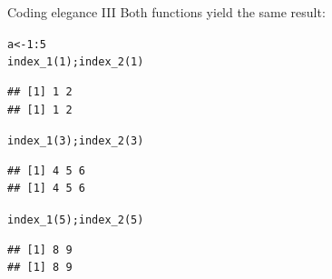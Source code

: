 \documentclass[xcolor=table,       handout,    xcolor=dvipsnames]{beamer}\usepackage[]{graphicx}\usepackage[]{color}
\makeatletter
\newcommand{\hlnum}[1]{\textcolor[rgb]{0,0,0}{#1}}
\newcommand{\hlopt}[1]{\textcolor[rgb]{0,0,0}{#1}}
\newcommand{\hlstd}[1]{\textcolor[rgb]{0,0,0}{#1}}
\newcommand{\hlkwb}[1]{\textcolor[rgb]{0,0,0}{#1}}
\newcommand{\hlkwd}[1]{\textcolor[rgb]{0,0,1}{#1}}
\newenvironment{kframe}{%
 \def\at@end@of@kframe{}%
 \ifinner\ifhmode%
  \def\at@end@of@kframe{\end{minipage}}%
  \begin{minipage}{\columnwidth}%
 \fi\fi%
 \def\FrameCommand##1{\hskip\@totalleftmargin \hskip-\fboxsep
 \colorbox{shadecolor}{##1}\hskip-\fboxsep
     \hskip-\linewidth \hskip-\@totalleftmargin \hskip\columnwidth}%
 \MakeFramed {\advance\hsize-\width
   \@totalleftmargin\z@ \linewidth\hsize
   \@setminipage}}%
 {\par\unskip\endMakeFramed%
 \at@end@of@kframe}
\newenvironment{knitrout}{}{} %
\makeatother
\begin{document}
\begin{frame}[fragile]{Coding elegance III}
Both functions yield the same result:
\begin{knitrout}\small
{}\color{fgcolor}\begin{kframe}
\begin{alltt}
\hlstd{a} \hlkwb{<-} \hlnum{1}\hlopt{:}\hlnum{5}
\hlkwd{index_1}\hlstd{(}\hlnum{1}\hlstd{);} \hlkwd{index_2}\hlstd{(}\hlnum{1}\hlstd{)}
\end{alltt}
\begin{verbatim}
## [1] 1 2
## [1] 1 2
\end{verbatim}
\begin{alltt}
\hlkwd{index_1}\hlstd{(}\hlnum{3}\hlstd{);} \hlkwd{index_2}\hlstd{(}\hlnum{3}\hlstd{)}
\end{alltt}
\begin{verbatim}
## [1] 4 5 6
## [1] 4 5 6
\end{verbatim}
\begin{alltt}
\hlkwd{index_1}\hlstd{(}\hlnum{5}\hlstd{);} \hlkwd{index_2}\hlstd{(}\hlnum{5}\hlstd{)}
\end{alltt}
\begin{verbatim}
## [1] 8 9
## [1] 8 9
\end{verbatim}
\end{kframe}
\end{knitrout}
\end{frame}


\end{document}
